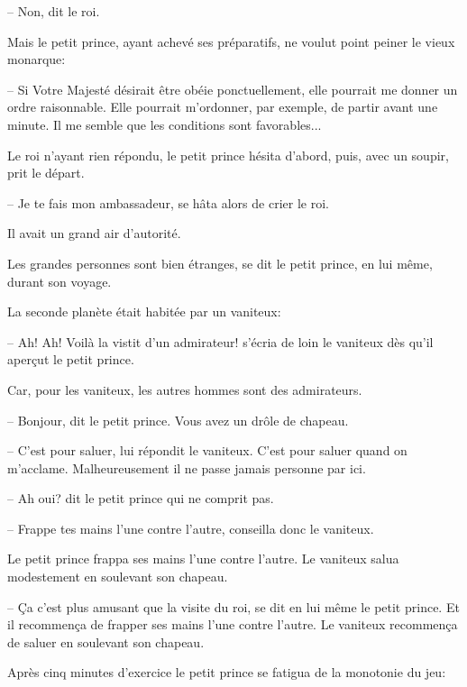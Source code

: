 \documentclass[a4paper]{report}
\begin{document}
-- Non, dit le roi.

Mais le petit prince, ayant achevé ses préparatifs, ne voulut point peiner le vieux monarque:

-- Si Votre Majesté désirait être obéie ponctuellement, elle pourrait me donner un ordre raisonnable. Elle pourrait m'ordonner, par exemple, de partir avant une minute. Il me semble que les conditions sont favorables...

Le roi n'ayant rien répondu, le petit prince hésita d'abord, puis, avec un soupir, prit le départ.

-- Je te fais mon ambassadeur, se hâta alors de crier le roi.

Il avait un grand air d'autorité.

Les grandes personnes sont bien étranges, se dit le petit prince, en lui même, durant son voyage.

\parachapter[XI]{} %

La seconde planète était habitée par un vaniteux:

-- Ah! Ah! Voilà la vistit d'un admirateur! s'écria de loin le vaniteux dès qu'il aperçut le petit prince. 


Car, pour les vaniteux, les autres hommes sont des admirateurs.

-- Bonjour, dit le petit prince. Vous avez un drôle de chapeau.

-- C'est pour saluer, lui répondit le vaniteux. C'est pour saluer quand on m'acclame. Malheureusement il ne passe jamais personne par ici.

-- Ah oui? dit le petit prince qui ne comprit pas.

-- Frappe tes mains l'une contre l'autre, conseilla donc le vaniteux.

Le petit prince frappa ses mains l'une contre l'autre. Le vaniteux salua modestement en soulevant son chapeau.

-- Ça c'est plus amusant que la visite du roi, se dit en lui même le petit prince. Et il recommença de frapper ses mains l'une contre l'autre. Le vaniteux recommença de saluer en soulevant son chapeau.

Après cinq minutes d'exercice le petit prince se fatigua de la monotonie du jeu:
\end{document}
